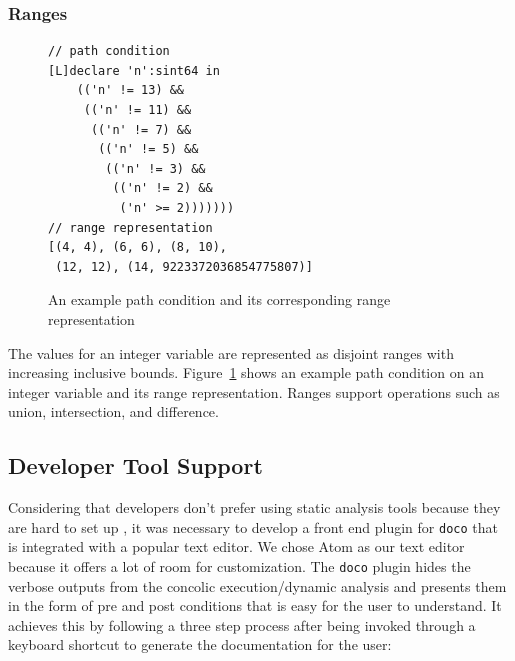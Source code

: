 \subsubsection{Ranges}

\begin{figure}
\centering
\begin{lstlisting}
// path condition
[L]declare 'n':sint64 in
    (('n' != 13) &&
     (('n' != 11) &&
      (('n' != 7) &&
       (('n' != 5) &&
        (('n' != 3) &&
         (('n' != 2) &&
          ('n' >= 2)))))))
// range representation
[(4, 4), (6, 6), (8, 10),
 (12, 12), (14, 9223372036854775807)]
\end{lstlisting}
\caption{An example path condition and its corresponding range representation}
\label{fig:pc-range}
\end{figure}

The values for an integer variable are represented as disjoint ranges with increasing inclusive bounds. Figure~\ref{fig:pc-range} shows an example path condition on an integer variable and its range representation. Ranges support operations such as union, intersection, and difference.

\subsection{Developer Tool Support}

Considering that developers don't prefer using static analysis tools because they are hard to set up \cite{Johnson:2013:WDS:2486788.2486877}, it was necessary to develop a front end plugin for \texttt{doco} that is integrated with a popular text editor. We chose Atom \cite{Atom} as our text editor because it offers a lot of room for customization. The \texttt{doco} plugin hides the verbose outputs from the concolic execution/dynamic analysis and presents them in the form of pre and post conditions that is easy for the user to understand. It achieves this by following a three step process after being invoked through a keyboard shortcut to generate the documentation for the user:

